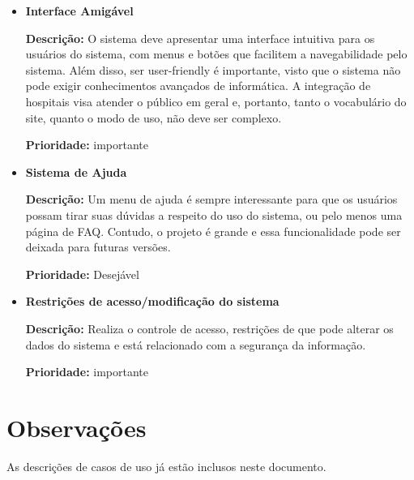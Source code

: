 \documentclass[11pt,a4paper]{report}
\begin{document}
\begin{itemize}

\item \textbf{Interface Amigável} 

\textbf{Descrição:} O sistema deve apresentar uma interface intuitiva para os usuários do sistema, com menus e botões que facilitem a navegabilidade pelo sistema.
Além disso, ser user-friendly é importante, visto que o sistema não pode exigir conhecimentos avançados de informática. A integração de hospitais visa atender o público em geral e, portanto, tanto o vocabulário do site, quanto o modo de uso, não deve ser complexo. 

\textbf{Prioridade:} importante


\item \textbf{Sistema de Ajuda} 

\textbf{Descrição:} Um menu de ajuda é sempre interessante para que os usuários possam tirar suas dúvidas a respeito do uso do sistema, ou pelo menos uma página de FAQ. Contudo, o projeto é grande e essa funcionalidade pode ser deixada para futuras versões. 

\textbf{Prioridade:} Desejável \newline


\item \textbf{Restrições de acesso/modificação do sistema}

\textbf{Descrição:} Realiza o controle de acesso, restrições de que pode alterar os dados do sistema e está relacionado com a segurança da informação.

\textbf{Prioridade:} importante

\end{itemize}

\section*{Observações}

As descrições de casos de uso já estão inclusos neste documento.
\end{document}
